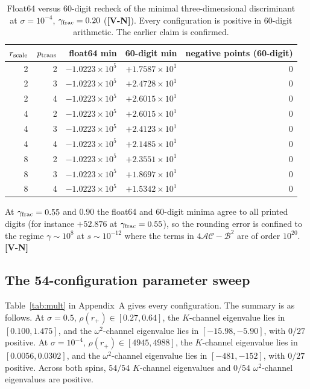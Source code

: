 \documentclass[11pt, a4paper]{article}
\newcommand{\VN}{\textcolor{vn}{\textbf{[V-N]}}}
\theoremstyle{remark}
\theoremstyle{definition}
\begin{document}
\begin{table}[H]
\centering
\caption{Float64 versus 60-digit recheck of the minimal three-dimensional discriminant at $\sigma = 10^{-4}$, $\gamma_{\rm frac} = 0.20$ (\VN). Every configuration is positive in 60-digit arithmetic. The earlier claim is confirmed.}
\label{tab:disc}
\begin{tabular}{@{}rrrrr@{}}
\toprule
$r_{\rm scale}$ & $p_{\rm trans}$ & float64 min & 60-digit min & negative points (60-digit) \\
\midrule
2 & 2 & $-1.0223\times10^5$ & $+1.7587\times10^1$ & 0 \\
2 & 3 & $-1.0223\times10^5$ & $+2.4728\times10^1$ & 0 \\
2 & 4 & $-1.0223\times10^5$ & $+2.6015\times10^1$ & 0 \\
4 & 2 & $-1.0223\times10^5$ & $+2.6015\times10^1$ & 0 \\
4 & 3 & $-1.0223\times10^5$ & $+2.4123\times10^1$ & 0 \\
4 & 4 & $-1.0223\times10^5$ & $+2.1485\times10^1$ & 0 \\
8 & 2 & $-1.0223\times10^5$ & $+2.3551\times10^1$ & 0 \\
8 & 3 & $-1.0223\times10^5$ & $+1.8697\times10^1$ & 0 \\
8 & 4 & $-1.0223\times10^5$ & $+1.5342\times10^1$ & 0 \\
\bottomrule
\end{tabular}
\end{table}

At $\gamma_{\rm frac} = 0.55$ and $0.90$ the float64 and 60-digit minima agree to all printed digits (for instance $+52.876$ at $\gamma_{\rm frac}=0.55$), so the rounding error is confined to the regime $\gamma\sim 10^8$ at $s\sim 10^{-12}$ where the terms in $4\mathcal{A}\mathcal{C} - \mathcal{B}^2$ are of order $10^{20}$. \VN

\subsection{The 54-configuration parameter sweep}

Table~\ref{tab:mult} in Appendix~A gives every configuration. The summary is as follows. At $\sigma = 0.5$, $\rho(r_+) \in [0.27, 0.64]$, the $K$-channel eigenvalue lies in $[0.100, 1.475]$, and the $\omega^2$-channel eigenvalue lies in $[-15.98, -5.90]$, with $0/27$ positive. At $\sigma = 10^{-4}$, $\rho(r_+) \in [4945, 4988]$, the $K$-channel eigenvalue lies in $[0.0056, 0.0302]$, and the $\omega^2$-channel eigenvalue lies in $[-481, -152]$, with $0/27$ positive. Across both spins, $54/54$ $K$-channel eigenvalues and $0/54$ $\omega^2$-channel eigenvalues are positive.
\end{document}
